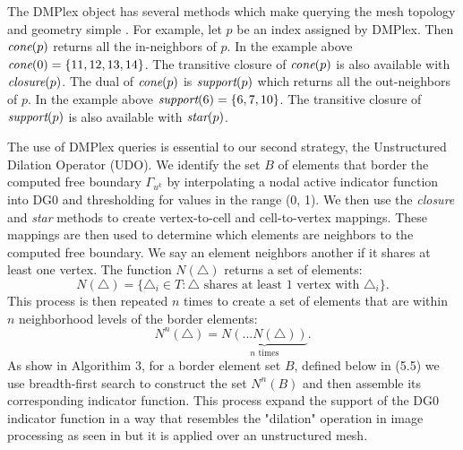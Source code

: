 \documentclass[12 pt]{report}
\begin{document}
The DMPlex object has several methods which make querying the mesh topology and geometry simple \citep{lange_efficient_2016}. For example, let $p$ be an index assigned by DMPlex. Then $\emph{cone}(p)$ returns all the in-neighbors of $p$. In the example above $\emph{cone}(0) = \{11, 12, 13, 14\}$. The transitive closure of $\emph{cone}(p)$ is also available with $\emph{closure}(p)$. The dual of $\emph{cone}(p)$ is $\emph{support}(p)$ which returns all the out-neighbors of $p$. In the example above $\emph{support}(6) = \{6, 7, 10\}$. The transitive closure of $\emph{support}(p)$ is also available with $\emph{star}(p)$. 

The use of DMPlex queries is essential to our second strategy, the Unstructured Dilation Operator (UDO). We identify the set $B$ of elements that border the computed free boundary $\Gamma_{u^k}$ by interpolating a nodal active indicator function into DG0 and thresholding for values in the range (0, 1). We then use the \emph{closure} and \emph{star} methods to create vertex-to-cell and cell-to-vertex mappings. These mappings are then used to determine which elements are neighbors to the computed free boundary. We say an element neighbors another if it shares at least one vertex. The function $N(\triangle)$ returns a set of elements:
\begin{equation}
  N(\triangle) = \{\triangle_i \in T: \triangle \text{ shares at least 1 vertex with } \triangle_i\}.
\end{equation}
This process is then repeated $n$ times to create a set of elements that are within $n$ neighborhood levels of the border elements:
\begin{equation}
  N^n(\triangle) = \underbrace{N(...N(\triangle))}_{n \text{ times}}.
\end{equation}
As show in Algorithim 3, for a border element set $B$, defined below in (5.5) we use breadth-first search to construct the set $N^n(B)$ and then assemble its corresponding indicator function. This process expand the support of the DG0 indicator function in a way that resembles the "dilation" operation in image processing as seen in \citep{OpenCV} but it is applied over an unstructured mesh.
\end{document}
